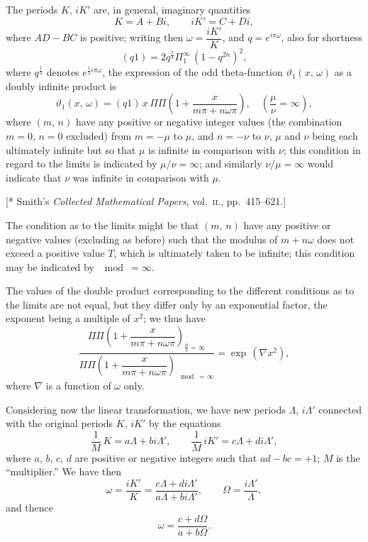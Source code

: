 \documentclass[11pt,a4paper]{article}
\theoremstyle{plain}
\theoremstyle{definition}
\theoremstyle{remark}
\begin{document}
The periods $K$, $iK'$ are, in general, imaginary quantities
\[
K = A + Bi,\qquad iK' = C + Di,
\]
where $AD - BC$ is positive; writing then $\omega = \dfrac{iK'}{K}$, and $q = e^{i\pi\omega}$, also for shortness
\[
(q1) = 2q^{\frac{1}{4}} \Pi_1^{\infty}\,(1-q^{2n})^2,
\]
where $q^{\frac{1}{4}}$ denotes $e^{\frac{1}{4}i\pi\omega}$, the expression of the odd theta-function $\vartheta_1(x,\,\omega)$ as a doubly infinite product is
\[
\vartheta_1(x,\,\omega) = (q1)\,x\,\Pi\Pi\left(1 + \frac{x}{m\pi + n\omega\pi}\right),\quad \left(\frac{\mu}{\nu} = \infty\right),
\]
where $(m,\,n)$ have any positive or negative integer values (the combination $m=0$, $n=0$ excluded) from $m = -\mu$ to $\mu$, and $n = -\nu$ to $\nu$, $\mu$ and $\nu$ being each ultimately infinite but so that $\mu$ is infinite in comparison with $\nu$; this condition in regard to the limits is indicated by $\mu/\nu = \infty$; and similarly $\nu/\mu = \infty$ would indicate that $\nu$ was infinite in comparison with $\mu$.

\begin{flushright}
\small[* Smith's \textit{Collected Mathematical Papers}, vol.~\textsc{ii.}, pp.~415--621.]
\end{flushright}

The condition as to the limits might be that $(m,\,n)$ have any positive or negative values (excluding as before) such that the modulus of $m + n\omega$ does not exceed a positive value $T$, which is ultimately taken to be infinite; this condition may be indicated by $\mod = \infty$.

The values of the double product corresponding to the different conditions as to the limits are not equal, but they differ only by an exponential factor, the exponent being a multiple of $x^2$; we thus have
\[
\frac{\Pi\Pi\left(1 + \dfrac{x}{m\pi + n\omega\pi}\right)_{\frac{\mu}{\nu}=\infty}}{\Pi\Pi\left(1 + \dfrac{x}{m\pi + n\omega\pi}\right)_{\mod=\infty}} = \exp\,(\nabla x^2),
\]
where $\nabla$ is a function of $\omega$ only.

Considering now the linear transformation, we have new periods $\Lambda$, $i\Lambda'$ connected with the original periods $K$, $iK'$ by the equations
\[
\frac{1}{M}\,K = a\Lambda + bi\Lambda',\qquad \frac{1}{M}\,iK' = c\Lambda + di\Lambda',
\]
where $a$, $b$, $c$, $d$ are positive or negative integers such that $ad - bc = +1$; $M$ is the ``multiplier.'' We have then
\[
\omega = \frac{iK'}{K} = \frac{c\Lambda + di\Lambda'}{a\Lambda + bi\Lambda'},\qquad \Omega = \frac{i\Lambda'}{\Lambda},
\]
and thence
\[
\omega = \frac{c + d\Omega}{a + b\Omega}.
\]
\end{document}
